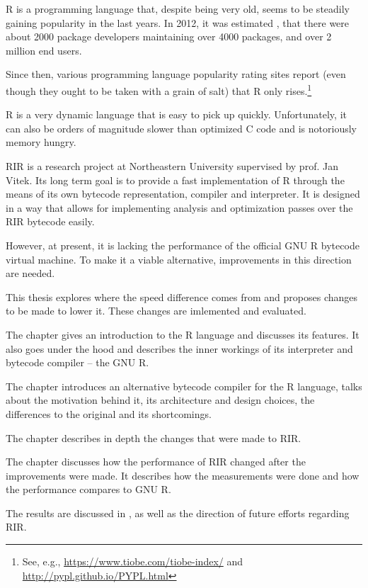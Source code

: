 R is a programming language that, despite being very old, seems to be steadily gaining popularity in the last years. In 2012, it was estimated \autocite{design}, that there were about 2000 package developers maintaining over 4000 packages, and over 2 million end users.

Since then, various programming language popularity rating sites report (even though they ought to be taken with a grain of salt) that R only rises.\footnote{See, e.g., \url{https://www.tiobe.com/tiobe-index/} and \url{http://pypl.github.io/PYPL.html}}

R is a very dynamic language that is easy to pick up quickly. Unfortunately, it can also be orders of magnitude slower than optimized C code and is notoriously memory hungry.

RIR is a research project at Northeastern University supervised by prof. Jan Vitek. Its long term goal is to provide a fast implementation of R through the means of its own bytecode representation, compiler and interpreter. It is designed in a way that allows for implementing analysis and optimization passes over the RIR bytecode easily.

However, at present, it is lacking the performance of the official GNU R bytecode virtual machine. To make it a viable alternative, improvements in this direction are needed.

This thesis explores where the speed difference comes from and proposes changes to be made to lower it. These changes are imlemented and evaluated.

The chapter \emph{} gives an introduction to the R language and discusses its features. It also goes under the hood and describes the inner workings of its interpreter and bytecode compiler -- the GNU R.

The chapter \emph{} introduces an alternative bytecode compiler for the R language, talks about the motivation behind it, its architecture and design choices, the differences to the original and its shortcomings.

The chapter \emph{} describes in depth the changes that were made to RIR.

The chapter \emph{} discusses how the performance of RIR changed after the improvements were made. It describes how the measurements were done and how the performance compares to GNU R.

The results are discussed in \emph{}, as well as the direction of future efforts regarding RIR.
